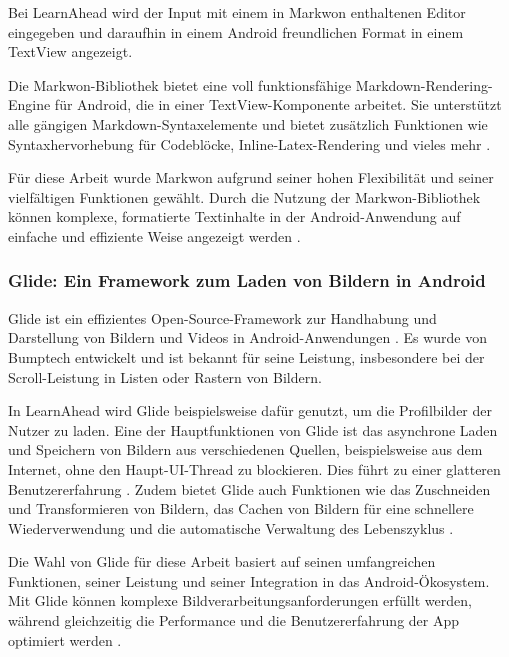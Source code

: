 \noindent
Bei LearnAhead wird der Input mit einem in Markwon enthaltenen Editor eingegeben und daraufhin in einem Android freundlichen Format in einem TextView angezeigt. \newline

\noindent
Die Markwon-Bibliothek bietet eine voll funktionsfähige Markdown-Rendering-Engine für Android, die in einer TextView-Komponente arbeitet. Sie unterstützt alle gängigen Markdown-Syntaxelemente und bietet zusätzlich Funktionen wie Syntaxhervorhebung für Codeblöcke, Inline-Latex-Rendering und vieles mehr \cite{Markwon2022}. \newline

\noindent
Für diese Arbeit wurde Markwon aufgrund seiner hohen Flexibilität und seiner vielfältigen Funktionen gewählt. Durch die Nutzung der Markwon-Bibliothek können komplexe, formatierte Textinhalte in der Android-Anwendung auf einfache und effiziente Weise angezeigt werden \cite{Markwon2022}.

\subsubsection{Glide: Ein Framework zum Laden von Bildern in Android}
Glide ist ein effizientes Open-Source-Framework zur Handhabung und Darstellung von Bildern und Videos in Android-Anwendungen \cite{Glide2022}. Es wurde von Bumptech entwickelt und ist bekannt für seine Leistung, insbesondere bei der Scroll-Leistung in Listen oder Rastern von Bildern. \newline

\noindent
In LearnAhead wird Glide beispielsweise dafür genutzt, um die Profilbilder der Nutzer zu laden. Eine der Hauptfunktionen von Glide ist das asynchrone Laden und Speichern von Bildern aus verschiedenen Quellen, beispielsweise aus dem Internet, ohne den Haupt-UI-Thread zu blockieren. Dies führt zu einer glatteren Benutzererfahrung \cite{Glide2022}. Zudem bietet Glide auch Funktionen wie das Zuschneiden und Transformieren von Bildern, das Cachen von Bildern für eine schnellere Wiederverwendung und die automatische Verwaltung des Lebenszyklus \cite{GlideGithub2022}. \newline

\noindent
Die Wahl von Glide für diese Arbeit basiert auf seinen umfangreichen Funktionen, seiner Leistung und seiner Integration in das Android-Ökosystem. Mit Glide können komplexe Bildverarbeitungsanforderungen erfüllt werden, während gleichzeitig die Performance und die Benutzererfahrung der App optimiert werden \cite{Glide2022}.


